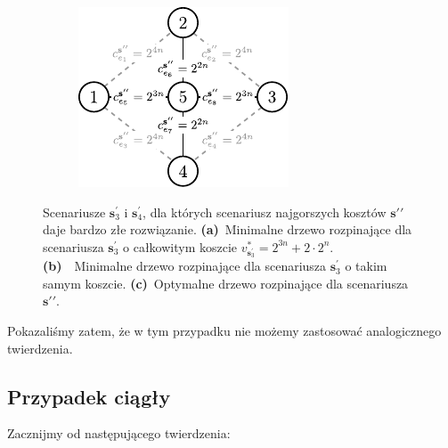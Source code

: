 \begin{figure}[!htbp]
\begin{subfigure}[b]{0.3\textwidth}
		\caption{}
		\label{fig:minmaxregexample3:b}
	\end{subfigure}
	\hfill
	\begin{subfigure}[b]{0.3\textwidth}
		\includegraphics[width=\textwidth]{Chapter_II/MIN-MAX-REG3-example/c}
		\caption{}
		\label{fig:minmaxregexample3:c}
	\end{subfigure}
	\hfill\null
	\caption{
		Scenariusze $\textbf{s}_{3}^{\prime}$ i $\textbf{s}_{4}^{\prime}$, dla których scenariusz najgorszych kosztów $\textbf{s}{\prime\prime}$ daje bardzo złe rozwiązanie.
		\textbf{(a)}~Minimalne drzewo rozpinające dla scenariusza $\textbf{s}_{3}^{\prime}$ o całkowitym koszcie $v^{\ast}_{\textbf{s}_{3}^{\prime}} = 2^{3n} + 2 \cdot 2^{n}$.
		\textbf{(b)}~~Minimalne drzewo rozpinające dla scenariusza $\textbf{s}_{3}^{\prime}$ o takim samym koszcie.
		\textbf{(c)}~Optymalne drzewo rozpinające dla scenariusza $\textbf{s}{\prime\prime}$.
	}
	\label{fig:minmaxregexample3}
\end{figure}

Pokazaliśmy zatem, że w tym przypadku nie możemy zastosować analogicznego twierdzenia.

\subsection{Przypadek ciągły}

Zacznijmy od następującego twierdzenia:

